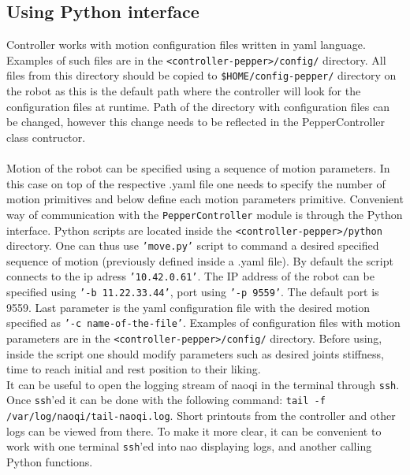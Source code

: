 \subsection{Using Python interface}
\noindent Controller works with motion configuration files written in yaml language. Examples of such files are in the
\texttt{<controller-pepper>/config/} directory. All files from this directory should be copied to
\texttt{\$HOME/config-pepper/} directory on the robot as this is the default path where the controller will look for the configuration files 
at runtime. Path of the directory with configuration files can be changed, however this change needs to be reflected in
the PepperController class contructor.\\ \\
\noindent Motion of the robot can be specified using a sequence of motion parameters. In this case on top of the
respective .yaml file one needs to specify the number of motion primitives and below define each motion parameters
primitive.
\noindent Convenient way of communication with the \texttt{PepperController} module is through the Python interface. Python scripts are located
inside the \texttt{<controller-pepper>/python} directory. One can thus use \texttt{'move.py'} script to command a desired specified
sequence of motion (previously defined inside a .yaml file). By default the script connects to the ip adress
\texttt{'10.42.0.61'}. The IP address of the robot can be specified using \texttt{'-b 11.22.33.44'}, port using
\texttt{'-p 9559'}. The default port is 9559. Last parameter is the yaml configuration file with the desired motion specified as 
\texttt{'-c name-of-the-file'}. Examples of configuration files with motion parameters are in the
\texttt{<controller-pepper>/config/} directory. Before using, inside the script one should modify parameters such as desired joints stiffness,
time to reach initial and rest position to their liking.\\

\noindent It can be useful to open the logging stream of naoqi in the terminal through \texttt{ssh}. Once
\texttt{ssh}'ed it can be done with the following command: \texttt{tail -f /var/log/naoqi/tail-naoqi.log}.
Short printouts from the controller and other logs can be viewed from there. To make it more clear, it can be convenient
to work with one terminal \texttt{ssh}'ed into nao displaying logs, and another calling Python functions.\\

